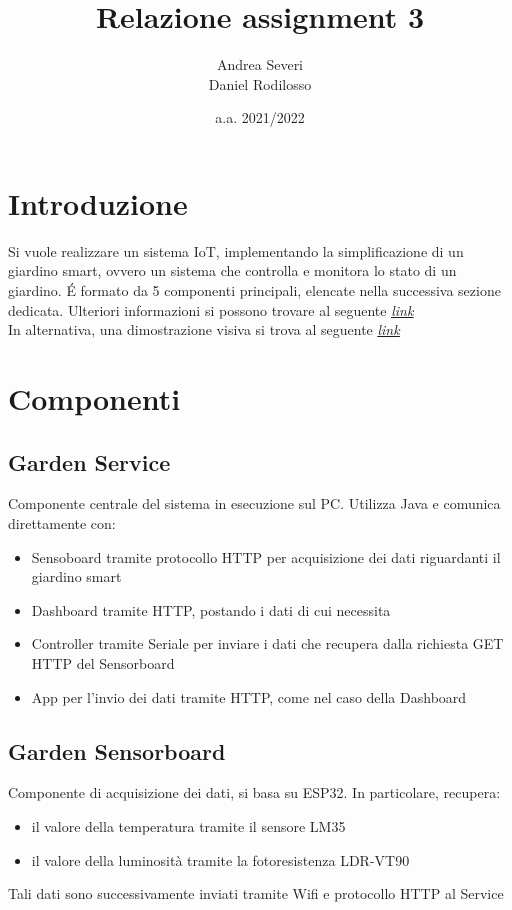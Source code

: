 \documentclass[a4paper, 12pt]{article}
\title{\textbf{Relazione assignment 3}}
\author{Andrea Severi\\Daniel Rodilosso}
\date{a.a. 2021/2022}
\begin{document}
\maketitle

\section{Introduzione}
Si vuole realizzare un sistema IoT, implementando la simplificazione di un giardino smart, ovvero un sistema che controlla e monitora lo stato di un giardino. \'E formato da 5 componenti principali, elencate nella successiva sezione dedicata. Ulteriori informazioni si possono trovare al seguente \href{https://docs.google.com/document/d/1oD8VSHPsmvpfgtXeALszZn8Bt9sD60pmsZQmUkinLm0/edit}{\underline{\emph{link}}}\\
In alternativa, una dimostrazione visiva si trova al seguente \href{https://liveunibo-my.sharepoint.com/:v:/g/personal/andrea_severi12_studio_unibo_it/Ebr-YQ9bWPhForXCmn0dCDIBFiw2Ak20UQRDlxhNdCWyyQ?e=LvFZex}{\underline{\emph{link}}}

\section{Componenti}
\subsection{Garden Service}
Componente centrale del sistema in esecuzione sul PC. Utilizza Java e comunica direttamente con:
\begin{itemize}
    \item Sensoboard tramite protocollo HTTP per acquisizione dei dati riguardanti il
    giardino smart
    \item Dashboard tramite HTTP, postando i dati di cui necessita
    \item Controller tramite Seriale per inviare i dati che recupera dalla richiesta GET HTTP del Sensorboard
    \item App per l'invio dei dati tramite HTTP, come nel caso della Dashboard
\end{itemize}
\clearpage
\subsection{Garden Sensorboard}
Componente di acquisizione dei dati, si basa su ESP32. In particolare, recupera:
\begin{itemize}
    \item il valore della temperatura tramite il sensore LM35
    \item il valore della luminosità tramite la fotoresistenza LDR-VT90
\end{itemize}
Tali dati sono successivamente inviati tramite Wifi e protocollo HTTP al Service
\end{document}
